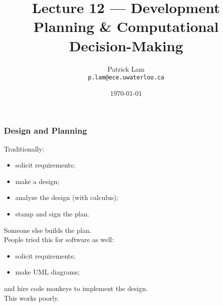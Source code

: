 

\title{Lecture 12 --- Development Planning \& Computational Decision-Making}

\author{Patrick Lam \\ \small \texttt{p.lam@ece.uwaterloo.ca}}
\date{\today}




\begin{frame}
  \titlepage
\end{frame}

\begin{frame}
\frametitle{Design and Planning}

\begin{changemargin}{1cm}

Traditionally:

\begin{itemize}
\item solicit requirements;
\item make a design;
\item analyze the design (with calculus);
\item stamp and sign the plan.
\end{itemize}
Someone else builds the plan.\\[1em]

People tried this for software as well:
\begin{itemize}
\item solicit requirements;
\item make UML diagrams; 
\end{itemize}
and hire code monkeys to implement the design.\\[1em]

This works poorly.

\end{changemargin}
\end{frame}

